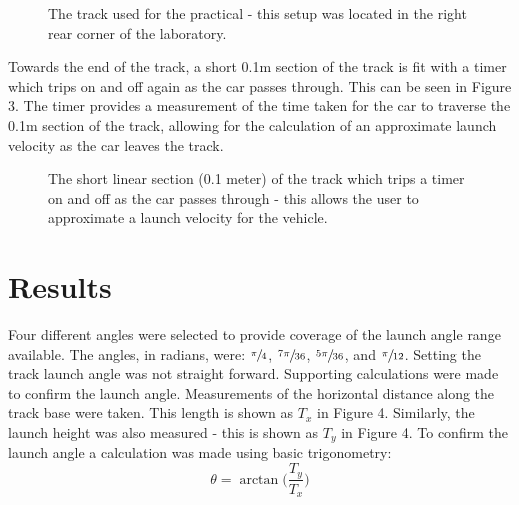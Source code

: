 \documentclass[a4paper]{article}
\begin{document}
\begin{figure}[h]
\begin{minipage}[t]{0.45\textwidth}
		\caption{The track used for the practical - this setup was located in the right rear corner of the laboratory.}
	\end{minipage}
\end{figure}

Towards the end of the track, a short 0.1$\si{\meter}$ section of the track is fit with a timer which trips on and off again as the car passes through. This can be seen in Figure 3. The timer provides a measurement of the time taken for the car to traverse the 0.1$\si{\meter}$ section of the track, allowing for the calculation of an approximate launch velocity as the car leaves the track.
\begin{figure}[h]
	\centering
	\caption{The short linear section (0.1 meter) of the track which trips a timer on and off as the car passes through - this allows the user to approximate a launch velocity for the vehicle.}
\end{figure}

\newpage

\section{Results}
Four different angles were selected to provide coverage of the launch angle range available. The angles, in radians, were: $\sfrac{\pi}{4}$, $\sfrac{7\pi}{36}$, $\sfrac{5\pi}{36}$, and $\sfrac{\pi}{12}$. Setting the track launch angle was not straight forward. Supporting calculations were made to confirm the launch angle. Measurements of the horizontal distance along the track base were taken. This length is shown as $T_x$ in Figure 4. Similarly, the launch height was also measured - this is shown as $T_y$ in Figure 4. To confirm the launch angle a calculation was made using basic trigonometry:
\begin{equation}
\theta = \arctan\bigg(\frac{T_y}{T_x}\bigg)
\end{equation}
\end{document}
